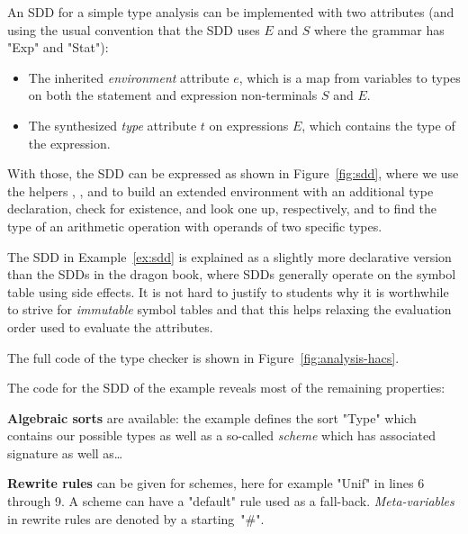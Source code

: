 \documentclass{article}
\begin{document}
\begin{example}\label{ex:sdd}
  An SDD for a simple type analysis can be implemented with two attributes (and using the usual
  convention that the SDD uses $E$ and $S$ where the \HAX grammar has "Exp" and "Stat"):
  \begin{itemize}

  \item The inherited \emph{environment} attribute $e$, which is a map from variables to types on
    both the statement and expression non-terminals $S$ and $E$.

  \item The synthesized \emph{type} attribute $t$ on expressions $E$, which contains the type of the
    expression.

  \end{itemize}
  With those, the SDD can be expressed as shown in Figure~\ref{fig:sdd}, where we use the helpers
  , , and  to build an extended environment with an additional
  type declaration, check for existence, and look one up, respectively, and  to find the
  type of an arithmetic operation with operands of two specific types.
\end{example}

The SDD in Example~\ref{ex:sdd} is explained as a slightly more declarative version than the SDDs in
the dragon book, where SDDs generally operate on the symbol table using side effects.  It is not
hard to justify to students why it is worthwhile to strive for \emph{immutable} symbol tables and
that this helps relaxing the evaluation order used to evaluate the attributes.

\begin{example}\label{ex:analysis-hacs}
  The full \HAX code of the type checker is shown in Figure~\ref{fig:analysis-hacs}.
\end{example}

The \HAX code for the SDD of the example reveals most of the remaining \HAX properties:

\smallskip\noindent\textbf{Algebraic sorts} are available: the example defines the sort "Type" which contains our
  possible types as well as a so-called \emph{scheme} which has associated signature as well as…

\smallskip\noindent\textbf{Rewrite rules} can be given for schemes, here for example "Unif" in lines 6 through 9.  A
  scheme can have a "default" rule used as a fall-back.  \emph{Meta-variables} in rewrite rules are
  denoted by a starting~"#".
\end{document}
